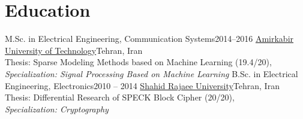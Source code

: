 \section{Education}
  \resumeSubHeadingListStart
    \resumeSubheading
      {M.Sc. in Electrical Engineering, Communication Systems}{2014--2016}
     {{\href{http://www.aut.ac.ir/}{Amirkabir University of Technology}}}{Tehran, Iran}
     \vspace{4pt}
      \\{Thesis: \small Sparse Modeling Methods based on Machine Learning (19.4/20),}\\ 
      \textit{Specialization: Signal Processing Based on Machine Learning} 
    \resumeSubheading
      {B.Sc. in Electrical Engineering, Electronics}{2010 -- 2014}
      {{\href{http://www.srttu.edu/}{Shahid Rajaee University}}}{Tehran, Iran}
      \vspace{4pt}
      \\{ Thesis: \small Differential Research of SPECK Block Cipher (20/20),}\\
         \textit{Specialization: Cryptography}

  \resumeSubHeadingListEnd





